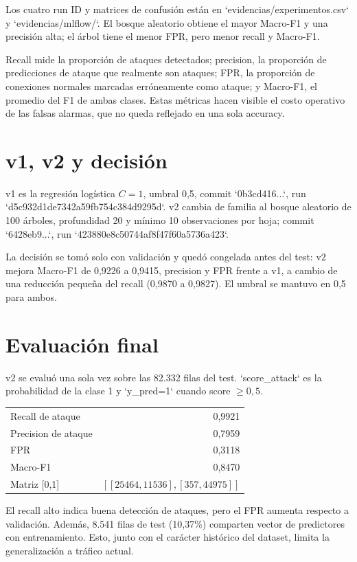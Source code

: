 \documentclass[10pt,a4paper]{article}
\begin{document}
Los cuatro run ID y matrices de confusión están en `evidencias/experimentos.csv` y `evidencias/mlflow/`. El bosque aleatorio obtiene el mayor Macro-F1 y una precisión alta; el árbol tiene el menor FPR, pero menor recall y Macro-F1.

Recall mide la proporción de ataques detectados; precision, la proporción de predicciones de ataque que realmente son ataques; FPR, la proporción de conexiones normales marcadas erróneamente como ataque; y Macro-F1, el promedio del F1 de ambas clases. Estas métricas hacen visible el costo operativo de las falsas alarmas, que no queda reflejado en una sola accuracy.

\section{v1, v2 y decisión}
v1 es la regresión logística $C=1$, umbral 0,5, commit `0b3cd416...`, run `d5c932d1de7342a59fb754c384d9295d`. v2 cambia de familia al bosque aleatorio de 100 árboles, profundidad 20 y mínimo 10 observaciones por hoja; commit `6428eb9...`, run `423880e8c50744af8f47f60a5736a423`.

La decisión se tomó solo con validación y quedó congelada antes del test: v2 mejora Macro-F1 de 0,9226 a 0,9415, precision y FPR frente a v1, a cambio de una reducción pequeña del recall (0,9870 a 0,9827). El umbral se mantuvo en 0,5 para ambos.

\section{Evaluación final}
v2 se evaluó una sola vez sobre las 82.332 filas del test. `score\_attack` es la probabilidad de la clase 1 y `y\_pred=1` cuando score $\geq 0,5$.

\begin{center}\small
\begin{tabular}{lr}
\toprule
Recall de ataque & 0,9921\\
Precision de ataque & 0,7959\\
FPR & 0,3118\\
Macro-F1 & 0,8470\\
Matriz [0,1] & $[[25464,11536],[357,44975]]$\\
\bottomrule
\end{tabular}
\end{center}

El recall alto indica buena detección de ataques, pero el FPR aumenta respecto a validación. Además, 8.541 filas de test (10,37\%) comparten vector de predictores con entrenamiento. Esto, junto con el carácter histórico del dataset, limita la generalización a tráfico actual.
\end{document}
